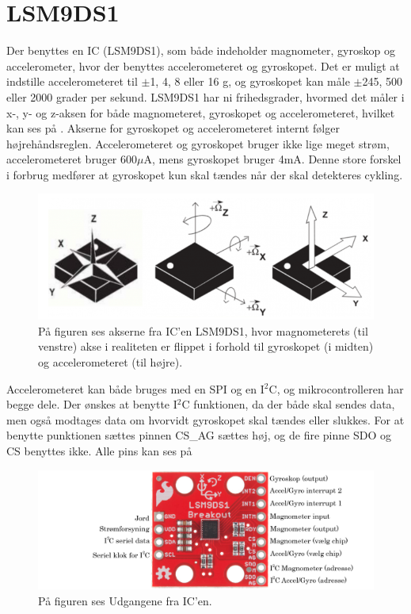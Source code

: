 \section{LSM9DS1}
Der benyttes en IC (LSM9DS1), som både indeholder magnometer, gyroskop og accelerometer, hvor der benyttes accelerometeret og gyroskopet. Det er muligt at indstille accelerometeret til $\pm$1, 4, 8 eller 16 g, og gyroskopet kan måle $\pm$245, 500 eller 2000 grader per sekund.\citep{Jimb02016} \newline
LSM9DS1 har ni frihedsgrader, hvormed det måler i x-, y- og z-aksen for både magnometeret, gyroskopet og accelerometeret, hvilket kan ses på . Akserne for gyroskopet og accelerometeret internt følger højrehåndsreglen.\citep{Jimb02016}\newline
Accelerometeret og gyroskopet bruger ikke lige meget strøm, accelerometeret bruger 600$\mu$A, mens gyroskopet bruger 4mA. Denne store forskel i forbrug medfører at gyroskopet kun skal tændes når der skal detekteres cykling. 
\begin{figure}[H]
	\centering
	\includegraphics[scale=0.6]{figures/cDesign/LSM9DS1.png}
	\caption{På figuren ses akserne fra IC'en LSM9DS1, hvor magnometerets (til venstre) akse i realiteten er flippet i forhold til gyroskopet (i midten) og accelerometeret (til højre).\citep{Jimb02016}}
	\label{vores_IC}
\end{figure}
Accelerometeret kan både bruges med en SPI og en I$^{2}$C, og mikrocontrolleren har begge dele. Der ønskes at benytte I$^{2}$C funktionen, da der både skal sendes data, men også modtages data om hvorvidt gyroskopet skal tændes eller slukkes. For at benytte punktionen sættes pinnen CS\_AG sættes høj, og de fire pinne SDO og CS benyttes ikke. Alle pins kan ses på 
\begin{figure}[H]
	\centering
	\includegraphics[scale=0.35]{figures/cDesign/accelerometeret.png}
	\caption{På figuren ses Udgangene fra IC'en.\citep{Jimb02016}}
	\label{IC_pins}
\end{figure}
